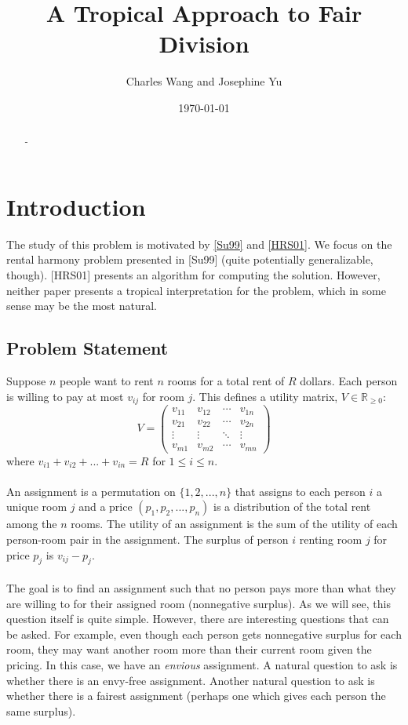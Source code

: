 \documentclass[12pt]{article}
\begin{document}
\title{\bf A Tropical Approach to Fair Division}
\author{ Charles Wang and Josephine Yu}
\date{\today}

\maketitle

\begin{abstract}
-
\end{abstract}


\section{Introduction}

The study of this problem is motivated by \href{https://www.math.hmc.edu/~su/papers.dir/rent.pdf}{[Su99]} and \href{http://wwwhomes.uni-bielefeld.de/imw-wp/files//imw-wp-311.pdf}{[HRS01]}. We focus on the rental harmony problem presented in [Su99] (quite potentially generalizable, though). [HRS01] presents an algorithm for computing the solution. However, neither paper presents a tropical interpretation for the problem, which in some sense may be the most natural.

\subsection{Problem Statement}

Suppose $n$ people want to rent $n$ rooms for a total rent of $R$ dollars. Each person is willing to pay at most $v_{ij}$ for room $j$. This defines a utility matrix, $V\in\mathbb{R}_{\ge0}$: 
\[V= \left( \begin{array}{rrrr}
 v_{11} & v_{12} & \cdots & v_{1n} \\
 v_{21} & v_{22} & \cdots & v_{2n} \\
 \vdots & \vdots & \ddots & \vdots \\
 v_{m1} & v_{m2} & \cdots & v_{mn}
 \end{array} \right)\]
where $v_{i1}+v_{i2}+...+v_{in}=R$ for  $1\le i\le n$.
\\\\
An assignment is a permutation on $\{1,2,...,n\}$ that assigns to each person $i$ a unique room $j$ and a price $(p_1,p_2,...,p_n)$ is a distribution of the total rent among the $n$ rooms. The utility of an assignment is the sum of the utility of each person-room  pair in the assignment. The surplus of person $i$ renting room $j$ for price $p_j$ is $v_{ij}-p_j$. 
\\\\
 The goal is to find an assignment such that no person pays more than what they are willing to for their assigned room (nonnegative surplus). As we will see, this question itself is quite simple. However, there are interesting questions that can be asked. For example, even though each person gets nonnegative surplus for each room, they may want another room more than their current room given the pricing. In this case, we have an \textit{envious} assignment. A natural question to ask is whether there is an envy-free assignment. Another natural question to ask is whether there is a fairest assignment (perhaps one which gives each person the same surplus). 
\end{document}
